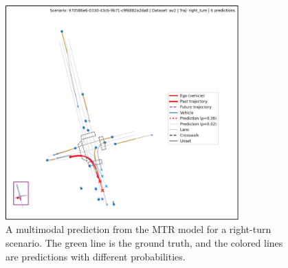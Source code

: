 \begin{figure}[htbp]
    \centering
    \includegraphics[width=0.8\textwidth]{figures/input_output_viz_ugly.png}
    \caption{A multimodal prediction from the MTR model for a right-turn scenario. The green line is the ground truth, and the colored lines are predictions with different probabilities.}
    \label{fig:mtr_prediction_merged}
\end{figure}